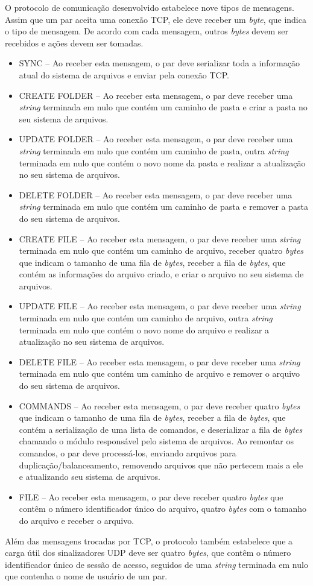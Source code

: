 \documentclass{article}
\begin{document}
\indent

O protocolo de comunicação desenvolvido estabelece nove tipos de mensagens. Assim que um par aceita uma conexão TCP, ele deve receber um \textit{byte}, que indica o tipo de mensagem. De acordo com cada mensagem, outros \textit{bytes} devem ser recebidos e ações devem ser tomadas.

\begin{itemize}
	\item SYNC -- Ao receber esta mensagem, o par deve serializar toda a informação atual do sistema de arquivos e enviar pela conexão TCP.
	\item CREATE FOLDER -- Ao receber esta mensagem, o par deve receber uma \textit{string} terminada em nulo que contém um caminho de pasta e criar a pasta no seu sistema de arquivos.
	\item UPDATE FOLDER -- Ao receber esta mensagem, o par deve receber uma \textit{string} terminada em nulo que contém um caminho de pasta, outra \textit{string} terminada em nulo que contém o novo nome da pasta e realizar a atualização no seu sistema de arquivos.
	\item DELETE FOLDER -- Ao receber esta mensagem, o par deve receber uma \textit{string} terminada em nulo que contém um caminho de pasta e remover a pasta do seu sistema de arquivos.
	\item CREATE FILE -- Ao receber esta mensagem, o par deve receber uma \textit{string} terminada em nulo que contém um caminho de arquivo, receber quatro \textit{bytes} que indicam o tamanho de uma fila de \textit{bytes}, receber a fila de \textit{bytes}, que contém as informações do arquivo criado, e criar o arquivo no seu sistema de arquivos.
	\item UPDATE FILE -- Ao receber esta mensagem, o par deve receber uma \textit{string} terminada em nulo que contém um caminho de arquivo, outra \textit{string} terminada em nulo que contém o novo nome do arquivo e realizar a atualização no seu sistema de arquivos.
	\item DELETE FILE -- Ao receber esta mensagem, o par deve receber uma \textit{string} terminada em nulo que contém um caminho de arquivo e remover o arquivo do seu sistema de arquivos.
	\item COMMANDS -- Ao receber esta mensagem, o par deve receber quatro \textit{bytes} que indicam o tamanho de uma fila de \textit{bytes}, receber a fila de \textit{bytes}, que contém a serialização de uma lista de comandos, e deserializar a fila de \textit{bytes} chamando o módulo responsável pelo sistema de arquivos. Ao remontar os comandos, o par deve processá-los, enviando arquivos para duplicação/balanceamento, removendo arquivos que não pertecem mais a ele e atualizando seu sistema de arquivos.
	\item FILE -- Ao receber esta mensagem, o par deve receber quatro \textit{bytes} que contêm o número identificador único do arquivo, quatro \textit{bytes} com o tamanho do arquivo e receber o arquivo.
\end{itemize}

Além das mensagens trocadas por TCP, o protocolo também estabelece que a carga útil dos sinalizadores UDP deve ser quatro \textit{bytes}, que contêm o número identificador único de sessão de acesso, seguidos de uma \textit{string} terminada em nulo que contenha o nome de usuário de um par.
\end{document}
